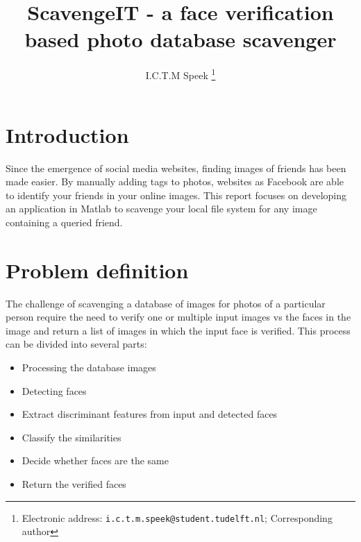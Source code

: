 \documentclass[10pt,a4paper,twocolumn]{article}
\title{ScavengeIT - a face verification based photo database scavenger}
\author{I.C.T.M Speek%
		\thanks{Electronic address: \texttt{i.c.t.m.speek@student.tudelft.nl}; Corresponding author}}
\affil{Computer Vision \\ Delft University of Technology}
\begin{document}
\maketitle



\begin{abstract}


\end{abstract}


\section{Introduction}
\label{sec:introduction}
Since the emergence of social media websites, finding images of friends has been made easier. By manually adding tags to photos, websites as Facebook are able to identify your friends in your online images. This report focuses on developing an application in Matlab to scavenge your local file system for any image containing a queried friend. 



\section{Problem definition}
\label{sec:problem}
The challenge of scavenging a database of images for photos of a particular person require the need to verify one or multiple input images vs the faces in the image and return a list of images in which the input face is verified. This process can be divided into several parts:

\begin{itemize}[noitemsep]
	\item Processing the database images
	\item Detecting faces
	\item Extract discriminant features from input and detected faces
	\item Classify the similarities
	\item Decide whether faces are the same
	\item Return the verified faces
\end{itemize}


\end{document}
